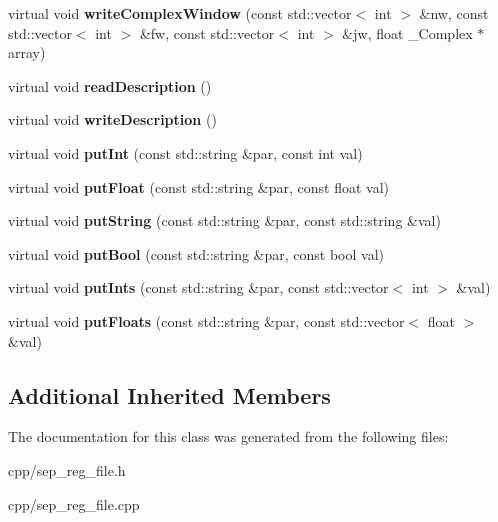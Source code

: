\begin{DoxyCompactItemize}
virtual void {\bfseries write\+Complex\+Window} (const std\+::vector$<$ int $>$ \&nw, const std\+::vector$<$ int $>$ \&fw, const std\+::vector$<$ int $>$ \&jw, float \+\_\+\+Complex $\ast$array)
\item 
\mbox{\label{class_s_e_p_1_1sep_reg_file_a9c58f0231bf6eb372f7b26895b434879}} 
virtual void {\bfseries read\+Description} ()
\item 
\mbox{\label{class_s_e_p_1_1sep_reg_file_ae2944bbd4bf221cce4dafc19c8d44c34}} 
virtual void {\bfseries write\+Description} ()
\item 
\mbox{\label{class_s_e_p_1_1sep_reg_file_a0e98fbd2981a145cc6008d4f4c8ef464}} 
virtual void {\bfseries put\+Int} (const std\+::string \&par, const int val)
\item 
\mbox{\label{class_s_e_p_1_1sep_reg_file_a65378cf249a1ea96776e57dd955e23d9}} 
virtual void {\bfseries put\+Float} (const std\+::string \&par, const float val)
\item 
\mbox{\label{class_s_e_p_1_1sep_reg_file_adeece68042332d34a411a84469bd13c9}} 
virtual void {\bfseries put\+String} (const std\+::string \&par, const std\+::string \&val)
\item 
\mbox{\label{class_s_e_p_1_1sep_reg_file_aa438859bb53d25ae33203f983957b40a}} 
virtual void {\bfseries put\+Bool} (const std\+::string \&par, const bool val)
\item 
\mbox{\label{class_s_e_p_1_1sep_reg_file_ad6911bf3f530e84ac5de60764998cb45}} 
virtual void {\bfseries put\+Ints} (const std\+::string \&par, const std\+::vector$<$ int $>$ \&val)
\item 
\mbox{\label{class_s_e_p_1_1sep_reg_file_a44a8bcc444ac88ef70e879505974f39e}} 
virtual void {\bfseries put\+Floats} (const std\+::string \&par, const std\+::vector$<$ float $>$ \&val)
\end{DoxyCompactItemize}
\subsection*{Additional Inherited Members}


The documentation for this class was generated from the following files\+:\begin{DoxyCompactItemize}
\item 
cpp/sep\+\_\+reg\+\_\+file.\+h\item 
cpp/sep\+\_\+reg\+\_\+file.\+cpp\end{DoxyCompactItemize}

